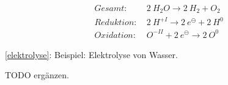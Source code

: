 {\large
	\begin{equation}
		\label{elektrolyse}
		\begin{split}
			Gesamt:\ &2\ H_2O \rightarrow 2\ H_2 + O_2 \\
			Reduktion:\ &2\ H^{+I} \rightarrow 2\ e^\ominus + 2\ H^0 \\
			Oxidation:\ &O^{-II} + 2\ e^\ominus \rightarrow 2\ O^0
		\end{split}
	\end{equation}
}

\ref{elektrolyse}: Beispiel: Elektrolyse von Wasser. \\

\begin{definition}[Galvanisieren]
	TODO ergänzen.
\end{definition}
